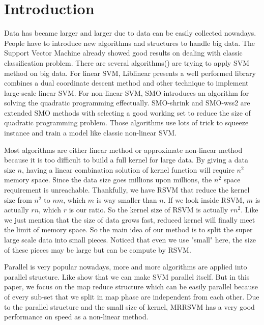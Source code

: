 \documentclass[conference]{IEEEtran}
\begin{document}
\section{Introduction}
Data has became larger and larger due to data can be easily collected nowadays. People have to introduce new algorithms and structures to handle big data. The Support Vector Machine already showed good results on dealing with classic classification problem. There are several algorithms(\cite{platt1998sequential, joachims1999making, fan2005working, zhang2004solving, kivinen2004online, shalev2011pegasos, ouyang2010fast, fan2008liblinear}) are trying to apply SVM method on big data. For linear SVM, Liblinear\cite{fan2008liblinear} presents a well performed library combines a dual coordinate descent method and other technique to implement large-scale linear SVM. For non-linear SVM, SMO\cite{platt1998sequential} introduces an algorithm for solving the quadratic programming effectually. SMO-shrink\cite{joachims1999making} and SMO-wss2\cite{fan2005working} are extended SMO methods with selecting a good working set to reduce the size of quadratic programming problem. Those algorithms use lots of trick to squeeze instance and train a model like classic non-linear SVM.

Most algorithms are either linear method or approximate non-linear method because it is too difficult to build a full kernel for large data. By giving a data size $n$, having a linear combination solution of kernel function will require $n^2$ memory space. Since the data size goes millions upon millions, the $n^2$ space requirement is unreachable. Thankfully, we have RSVM that reduce the kernel size from $n^2$ to $nm$, which $m$ is way smaller than $n$. If we look inside RSVM, $m$ is actually $rn$, which $r$ is our ratio. So the kernel size of RSVM is actually $rn^2$. Like we just mention that the size of data grows fast, reduced kernel will finally meet the limit of memory space. So the main idea of our method is to split the super large scale data into small pieces. Noticed that even we use "small" here, the size of these pieces may be large but can be compute by RSVM.

Parallel is very popular nowadays, more and more algorithms are applied into parallel structure. Like \cite{graf2004parallel, collobert2002parallel} show that we can make SVM parallel itself. But in this paper, we focus on the map reduce structure which can be easily parallel because of every sub-set that we split in map phase are independent from each other. Due to the parallel structure and the small size of kernel, MRRSVM has a very good performance on speed as a non-linear method.
\end{document}

